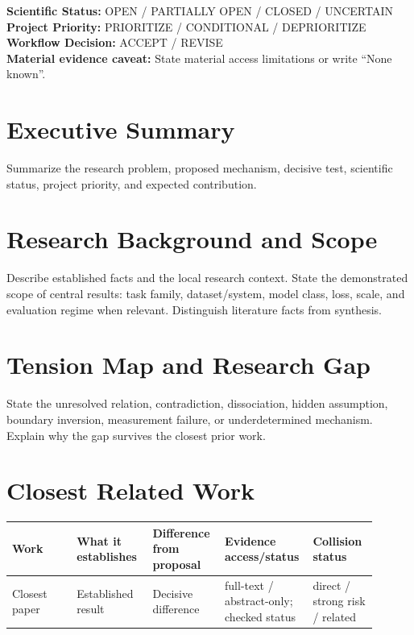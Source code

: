 \documentclass[11pt]{article}
\title{\ProjectTitle}
\author{Generated with the OhMyTaste research workflow}
\date{\today}
\newcommand{\ScientificStatus}{OPEN / PARTIALLY OPEN / CLOSED / UNCERTAIN}
\newcommand{\ProjectPriority}{PRIORITIZE / CONDITIONAL / DEPRIORITIZE}
\newcommand{\Decision}{ACCEPT / REVISE}
\newcommand{\EvidenceCaveat}{State material access limitations or write ``None known''.}
\begin{document}
\maketitle

\noindent\textbf{Scientific Status:} \ScientificStatus\\
\textbf{Project Priority:} \ProjectPriority\\
\textbf{Workflow Decision:} \Decision\\
\textbf{Material evidence caveat:} \EvidenceCaveat

\section{Executive Summary}
Summarize the research problem, proposed mechanism, decisive test, scientific status, project priority, and expected contribution.

\section{Research Background and Scope}
Describe established facts and the local research context. State the demonstrated scope of central results: task family, dataset/system, model class, loss, scale, and evaluation regime when relevant. Distinguish literature facts from synthesis.

\section{Tension Map and Research Gap}
State the unresolved relation, contradiction, dissociation, hidden assumption, boundary inversion, measurement failure, or underdetermined mechanism. Explain why the gap survives the closest prior work.

\section{Closest Related Work}
\begin{longtable}{p{0.17\linewidth}p{0.20\linewidth}p{0.19\linewidth}p{0.17\linewidth}p{0.17\linewidth}}
\toprule
Work & What it establishes & Difference from proposal & Evidence access/status & Collision status \\
\midrule
Closest paper & Established result & Decisive difference & full-text / abstract-only; checked status & direct / strong risk / related \\
\bottomrule
\end{longtable}
\end{document}
